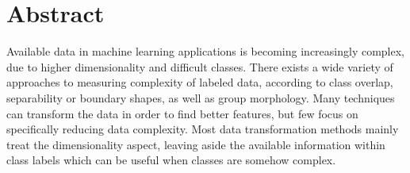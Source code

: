 



\newcommand{\change}[1]{{\color{blue}#1}}
\renewcommand{\change}[1]{#1}
\newcommand{\rechange}[1]{{\color{blue}#1}}
\renewcommand{\rechange}[1]{#1}

\setchapterpreamble[u]{\margintoc}
\label{ch:paper6}

  \section*{Abstract}
    Available data in machine learning applications is becoming increasingly complex, due to higher dimensionality and difficult classes. There exists a wide variety of approaches to measuring complexity of labeled data, according to class overlap, separability or boundary shapes, as well as \rechange{group morphology}. Many techniques can transform the data in order to find better features, but few focus on specifically reducing data complexity. Most \rechange{data transformation} methods mainly treat the dimensionality aspect, leaving aside the available information \rechange{within} class labels which can be useful when classes are somehow complex.

